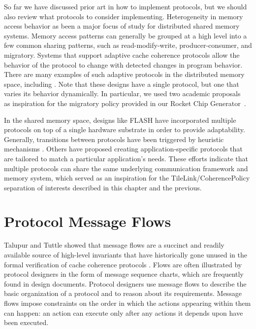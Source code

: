 So far we have discussed prior art in how to implement protocols,
but we should also review what protocols to consider implementing.
Heterogeneity in memory access behavior as been a major focus of study for distributed shared memory systems.
Memory access patterns can generally be grouped at a high level into a few common sharing patterns, such as read-modify-write, producer-consumer, and migratory.
Systems that support adaptive cache coherence protocols allow the behavior of the protocol to change with detected changes in program behavior.
There are many examples of such adaptive protocols in the distributed memory space,
including \cite{amza-hpca97,lebeck-archnews95,stenstrom-isca93,cox-isca93}.
Note that these designs have a single protocol, but one that varies its behavior dynamically.
In particular, we used two academic proposals~\cite{stenstrom-isca93,cox-isca93} as inspiration for the migratory policy provided in our Rocket Chip Generator~\cite{rocket}.

In the shared memory space, designs like FLASH \cite{kuskin-archnews94} have incorporated multiple protocols on top of a single hardware substrate in order to provide adaptability. Generally, transitions between protocols have been triggered by heuristic mechanisms \cite{mukherjee-archnews98}. Others \cite{chandra-sigplan96,falsafi-sc94} have proposed creating application-specific protocols that are tailored to match a particular application's needs.
These efforts indicate that multiple protocols can share the same underlying communication framework and memory system,
which served as an inspiration for the TileLink/CoherencePolicy separation of interests described in this chapter and the previous.

\section{Protocol Message Flows}

Talupur and Tuttle showed that message flows are a succinct and
readily available source of high-level invariants that have historically gone
unused in the formal verification of cache coherence protocols \cite{talupur2008going}.
Flows are often illustrated by protocol designers in the form of message sequence charts,
which are frequently found in design documents.
Protocol designers use message flows to describe
the basic organization of a protocol and to reason about its requirements.
Message flows impose constraints on the order in which the actions appearing within them can happen:
an action can execute only after any actions it depends upon have been executed.

